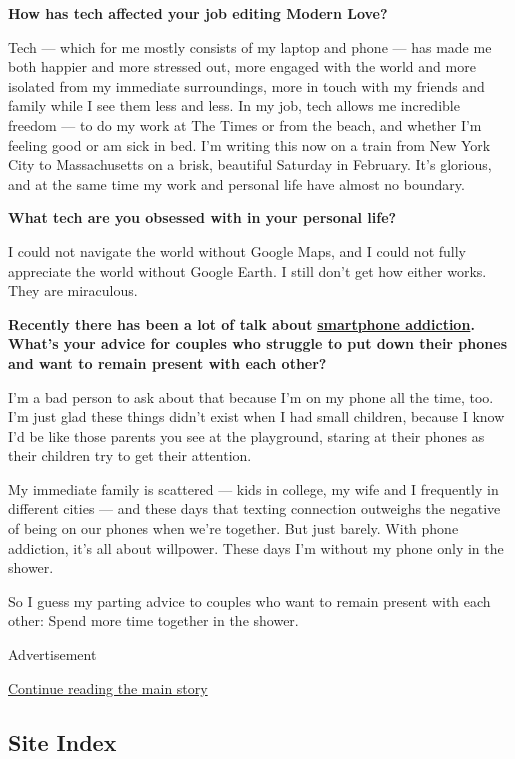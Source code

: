 \textbf{How has tech affected your job editing Modern Love?}

Tech --- which for me mostly consists of my laptop and phone --- has
made me both happier and more stressed out, more engaged with the world
and more isolated from my immediate surroundings, more in touch with my
friends and family while I see them less and less. In my job, tech
allows me incredible freedom --- to do my work at The Times or from the
beach, and whether I'm feeling good or am sick in bed. I'm writing this
now on a train from New York City to Massachusetts on a brisk, beautiful
Saturday in February. It's glorious, and at the same time my work and
personal life have almost no boundary.

\textbf{What tech are you obsessed with in your personal life?}

I could not navigate the world without Google Maps, and I could not
fully appreciate the world without Google Earth. I still don't get how
either works. They are miraculous.

\textbf{Recently there has been a lot of talk about}
\href{https://www.nytimes3xbfgragh.onion/2018/01/08/technology/apple-tech-children-jana-calstrs.html}{\textbf{smartphone
addiction}}\textbf{. What's your advice for couples who struggle to put
down their phones and want to remain present with each other?}

I'm a bad person to ask about that because I'm on my phone all the time,
too. I'm just glad these things didn't exist when I had small children,
because I know I'd be like those parents you see at the playground,
staring at their phones as their children try to get their attention.

My immediate family is scattered --- kids in college, my wife and I
frequently in different cities --- and these days that texting
connection outweighs the negative of being on our phones when we're
together. But just barely. With phone addiction, it's all about
willpower. These days I'm without my phone only in the shower.

So I guess my parting advice to couples who want to remain present with
each other: Spend more time together in the shower.

Advertisement

\protect\hyperlink{after-bottom}{Continue reading the main story}

\hypertarget{site-index}{%
\subsection{Site Index}\label{site-index}}

